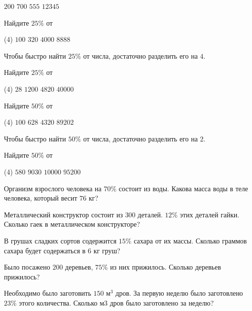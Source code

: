 \begin{class}[number=1]
\begin{listofex}[resume]
\begin{tasks}
			\task \( 200 \)
			\task \( 700 \)
			\task \( 555 \)
			\task \( 12345 \)
		\end{tasks}
		\item Найдите \( 25\% \) от
		\begin{tasks}(4)
			\task \( 100 \)
			\task \( 320 \)
			\task \( 4000 \)
			\task \( 8888 \)
		\end{tasks}
	\end{listofex}
		\begin{definit}
		Чтобы быстро найти \( 25\% \) от числа, достаточно разделить его на \( 4 \).
		\end{definit}	
	\begin{listofex}[resume]
		\item Найдите \( 25\% \) от
		\begin{tasks}(4)
			\task \( 28 \)
			\task \( 1200 \)
			\task \( 4820 \)
			\task \( 40000 \)
		\end{tasks}
		\item Найдите \( 50\% \) от
		\begin{tasks}(4)
			\task \( 100 \)
			\task \( 628 \)
			\task \( 4320 \)
			\task \( 89202 \)
		\end{tasks}
	\end{listofex}
		\begin{definit}
			Чтобы быстро найти \( 50\% \) от числа, достаточно разделить его на \( 2 \).
		\end{definit}
		\begin{listofex}[resume]
			\item Найдите \( 50\% \) от
			\begin{tasks}(4)
				\task \( 580 \)
				\task \( 9030 \)
				\task \( 10000 \)
				\task \( 95200 \)
			\end{tasks}
			\item Организм взрослого человека на \( 70\% \) состоит из воды. Какова масса воды в теле человека, который весит \( 76 \) кг?
			\item Металлический конструктор состоит из \( 300 \) деталей. \( 12\% \) этих деталей гайки. Сколько гаек в металлическом конструкторе?
			\item В грушах сладких сортов содержится \( 15\% \) сахара от их массы. Сколько граммов сахара будет содержаться в \( 6 \) кг груш?
			\item Было посажено \( 200 \) деревьев, \( 75\% \) из них прижилось. Сколько деревьев прижилось?
			\item Необходимо было заготовить \( 150 \) м\( ^3 \) дров. За первую неделю было заготовлено \( 23\% \) этого количества. Сколько м3 дров было заготовлено за неделю?
		\end{listofex}
\end{class}

